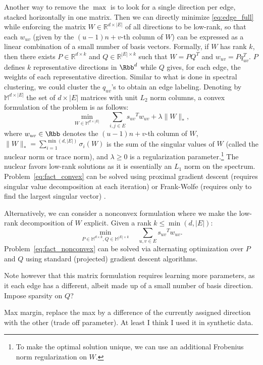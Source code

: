 Another way to remove the $\max$ is to look for a single direction per edge, stacked horizontally in
one matrix. Then we can directly minimize \eqref{eq:edge_full} while enforcing the matrix
$W\in\mathbb{R}^{d\times |E|}$ of all directions to be low-rank, so that each $w_{uv}$ (given by the
$(u-1)n+v$-th column of $W$) can be expressed as a linear combination of a small number of basis
vectors. Formally, if $W$ has rank $k$, then there exists $P\in\mathbb{R}^{d\times k}$ and
$Q\in\mathbb{R}^{|E|\times k}$ such that $W=PQ^T$ and $w_{uv} = Pq_{uv}^T$. $P$ defines $k$
representative directions in $\Rbb^d$ while $Q$ gives, for each edge, the weights of each
representative direction. Similar to what is done in spectral clustering, we could cluster the
$q_{uv}$'s to obtain an edge labeling.
%
Denoting by $\mathbb{M}^{d\times |E|}$ the set of $d\times |E|$ matrices with unit $L_2$ norm
columns, a convex formulation of the problem is as follows:
\begin{equation}
  \label{eq:fact_convex}
  \min_{W\in\mathbb{M}^{d\times |E|}} \quad
  \sum_{i,j \in E} {s_{uv}}^T w_{uv} + \lambda \|W\|_*,
\end{equation}
where $w_{uv} \in \Rbb$ denotes the $(u-1)n+v$-th column of $W$, $\|W\|_* =
\sum_{i=1}^{\min(d,|E|)}\sigma_i(W)$ is the sum of the singular values of $W$ (called the nuclear
norm or trace norm), and $\lambda \geq 0$ is a regularization parameter.\footnote{To make the
optimal solution unique, we can use an additional Frobenius norm regularization on $W$.} The nuclear
favors low-rank solutions as it is essentially an $L_1$ norm on the spectrum.
Problem~\eqref{eq:fact_convex} can be solved using proximal gradient descent (requires singular
value decomposition at each iteration) \autocite{Parikh2013a} or Frank-Wolfe (requires only to find
the largest singular vector) \autocite{Jaggi2013a}.

Alternatively, we can consider a nonconvex formulation where we make the low-rank decomposition of
$W$ explicit. Given a rank $k\leq \min(d,|E|)$:
\begin{equation}
  \label{eq:fact_nonconvex}
  \min_{P\in\mathbb{M}^{d\times k}, Q\in\mathbb{M}^{|E|\times k}} \quad
  \sum_{u,v \in E} {s_{uv}}^T w_{uv}.
\end{equation}
Problem~\eqref{eq:fact_nonconvex} can be solved via alternating optimization over $P$ and $Q$ using
standard (projected) gradient descent algorithms.

Note however that this matrix formulation requires learning more parameters, as it each edge has a
different, albeit made up of a small number of basis direction.  Impose sparsity on $Q$?

Max margin, replace the max by a difference of the currently assigned direction with the other
(trade off parameter). At least I think I used it in synthetic data.

